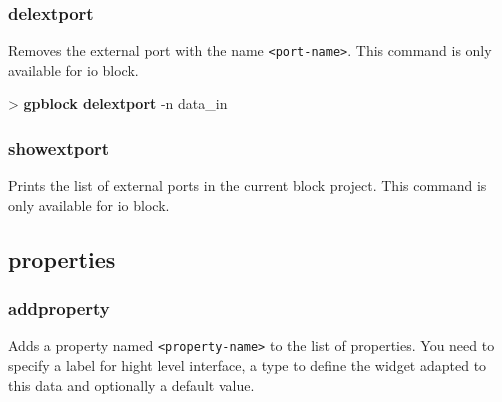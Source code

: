 \documentclass[10pt,a4paper]{article}
\begin{document}

\subsubsection{delextport}
\label{subsec:delextport}

Removes the external port with the name \texttt{<port-name>}. This command is only available for io block.\\


\begin{sampletitle}
> \textbf{gpblock delextport} -n data\_in
\end{sampletitle}


\subsubsection{showextport}
\label{subsec:showextport}

Prints the list of external ports in the current block project. This command is only available for io block.

\subsection{properties}
\subsubsection{addproperty}
\label{subsec:addproperty}

Adds a property named \texttt{<property-name>} to the list of properties. You need to specify a label for hight level interface, a type to define the widget adapted to this data and optionally a default value.\\

\end{document}
